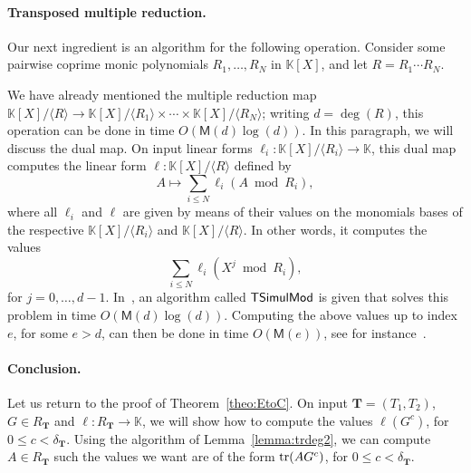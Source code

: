 \documentclass[12pt]{article}
\def\K {\ensuremath{\mathbb{K}}}
\def\M {\ensuremath{\mathsf{M}}}
\def\Tt {\ensuremath{\mathbf{T}}}
\begin{document}
\paragraph{Transposed multiple reduction.} Our next ingredient 
is an algorithm for the following operation. Consider some pairwise
coprime monic polynomials $R_1,\dots,R_N$ in $\K[X]$, 
and let $R=R_1 \cdots R_N$.

We have already mentioned the multiple reduction map $\K[X]/\langle R
\rangle \to \K[X]/\langle R_1 \rangle \times \cdots \times
\K[X]/\langle R_N \rangle$; writing $d=\deg(R)$, this operation can be
done in time $O(\M(d)\log(d))$. In this paragraph, we will discuss the
dual map. On input linear forms $\ell_i:\K[X]/\langle R_i \rangle\to
\K$, this dual map computes the linear form $\ell:\K[X]/\langle R
\rangle$ defined by
$$A\mapsto \sum_{i\le N} \ell_i(A \bmod R_i),$$ where all $\ell_i$ and
$\ell$ are given by means of their values on the monomials bases of
the respective $\K[X]/\langle R_i \rangle$ and $\K[X]/\langle R
\rangle$. In other words, it computes the values
$$ \sum_{i\le N} \ell_i(X^j \bmod R_i),$$ for $j=0,\dots,d-1$.
In~\cite{BoLeSaScWi04}, an algorithm called ${\sf TSimulMod}$ is given
that solves this problem in time $O(\M(d)\log(d))$. Computing the
above values up to index $e$, for some $e>d$, can then be done in time
$O(\M(e))$, see for instance~\cite{BoLeSc03}.

\paragraph{Conclusion.} Let us return to the proof of Theorem~\ref{theo:EtoC}.
On input $\Tt=(T_1,T_2)$, $G\in R_\Tt$ and $\ell:R_\Tt\to \K$, we will
show how to compute the values $\ell(G^c)$, for $0 \le c<\delta_\Tt$.
Using the algorithm of Lemma~\ref{lemma:trdeg2}, we can compute $A \in
R_\Tt$ such the values we want are of the form ${\rm tr}(A G^c)$, for
$0 \le c<\delta_\Tt$.
\end{document}
